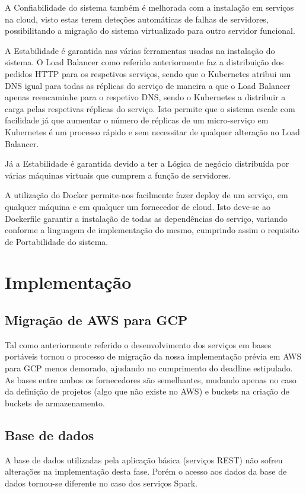 \documentclass[11pt,a4paper]{article}
\begin{document}
A Confiabilidade do sistema também é melhorada com a instalação em serviços na cloud, visto estas terem deteções automáticas de falhas de servidores, possibilitando a migração do sistema virtualizado para outro servidor funcional.
\newline

A Estabilidade é garantida nas várias ferramentas usadas na instalação do sistema. O Load Balancer como referido anteriormente faz a distribuição dos pedidos HTTP para os respetivos serviços, sendo que o Kubernetes atribui um DNS igual para todas as réplicas do serviço de maneira a que o Load Balancer apenas reencaminhe para o respetivo DNS, sendo o Kubernetes a distribuir a carga pelas respetivas réplicas do serviço. Isto permite que o sistema escale com facilidade já que aumentar o número de réplicas de um micro-serviço em Kubernetes é um processo rápido e sem necessitar de qualquer alteração no Load Balancer.
\newline

Já a Estabilidade é garantida devido a ter a Lógica de negócio distribuída por várias máquinas virtuais que cumprem a função de servidores.
\newline


A utilização do Docker permite-nos facilmente fazer deploy de um serviço, em qualquer máquina e em qualquer um fornecedor de cloud. Isto deve-se ao Dockerfile garantir a instalação de todas as dependências do serviço, variando conforme a linguagem de implementação do mesmo, cumprindo assim o requisito de Portabilidade do sistema.

\section{Implementação}

\subsection{Migração de AWS para GCP}
Tal como anteriormente referido o desenvolvimento dos serviços em bases portáveis tornou o processo de migração da nossa implementação prévia em AWS para GCP menos demorado, ajudando no cumprimento do deadline estipulado. As bases entre ambos os fornecedores são semelhantes, mudando apenas no caso da definição de projetos (algo que não existe no AWS) e buckets na criação de buckets de armazenamento.

\subsection{Base de dados}
A base de dados utilizadas pela aplicação básica (serviços REST) não sofreu alterações na implementação desta fase. Porém o acesso aos dados da base de dados tornou-se diferente no caso dos serviços Spark.
\end{document}
